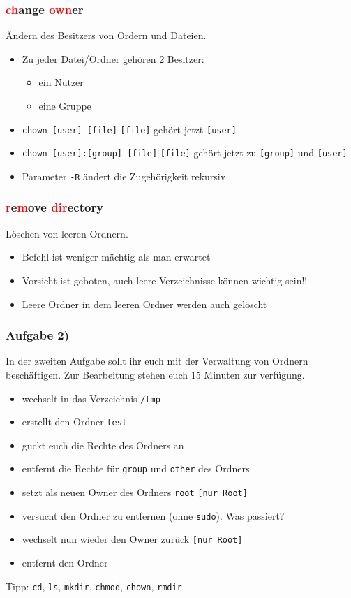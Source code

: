 \documentclass[12pt,utf8]{beamer}
\begin{document}
\begin{frame}
\frametitle{\textcolor{red}{ch}ange \textcolor{red}{own}er}
Ändern des Besitzers von Ordern und Dateien.
\begin{itemize}
	\item Zu jeder Datei/Ordner gehören 2 Besitzer:
	\begin{itemize}[<+->]
		\item ein Nutzer
		\item eine Gruppe
	\end{itemize}
	\item \texttt{chown [user] [file]} \texttt{[file]} gehört jetzt \texttt{[user]}
	\item \texttt{chown [user]:[group] [file]} \texttt{[file]} gehört jetzt zu \texttt{[group]} und \texttt{[user]}
	\item Parameter \texttt{-R} ändert die Zugehörigkeit rekursiv
\end{itemize}
\end{frame}

\begin{frame}
\frametitle{\textcolor{red}{r}e\textcolor{red}{m}ove \textcolor{red}{dir}ectory}
Löschen von leeren Ordnern.
\begin{itemize}
	\item Befehl ist weniger mächtig als man erwartet
	\item Vorsicht ist geboten, auch leere Verzeichnisse können wichtig sein!!
	\item Leere Ordner in dem leeren Ordner werden auch gelöscht
\end{itemize}
\end{frame}

\begin{frame}
\frametitle{Aufgabe 2)}
In der zweiten Aufgabe sollt ihr euch mit der Verwaltung von Ordnern beschäftigen. Zur Bearbeitung stehen euch 15 Minuten zur verfügung.
{\footnotesize
\begin{itemize}
	\item wechselt in das Verzeichnis \texttt{/tmp}
	\item erstellt den Ordner \texttt{test}
	\item guckt euch die Rechte des Ordners an
	\item entfernt die Rechte für \texttt{group} und \texttt{other} des Ordners
	\item setzt als neuen Owner des Ordners \texttt{root} \texttt{[nur Root]}
	\item versucht den Ordner zu entfernen (ohne \texttt{sudo}). Was passiert?
	\item wechselt nun wieder den Owner zurück \texttt{[nur Root]}
	\item entfernt den Ordner
\end{itemize}
}
{\scriptsize Tipp: \texttt{cd}, \texttt{ls}, \texttt{mkdir}, \texttt{chmod}, \texttt{chown}, \texttt{rmdir}}
\end{frame}
\end{document}
